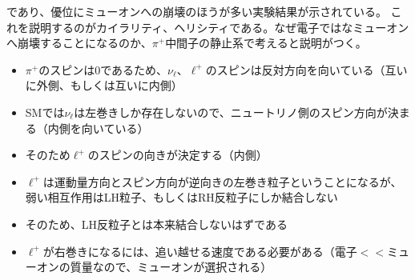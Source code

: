 であり、優位にミューオンへの崩壊のほうが多い実験結果が示されている。
これを説明するのがカイラリティ、ヘリシティである。なぜ電子ではなミューオンへ崩壊することになるのか、$\pi^+$中間子の静止系で考えると説明がつく。
\begin{itemize}
  \item $\pi^+$のスピンは0であるため、$\nu_\ell$、$\ell^+$のスピンは反対方向を向いている（互いに外側、もしくは互いに内側）
  \item SMでは$\nu_\ell$は左巻きしか存在しないので、ニュートリノ側のスピン方向が決まる（内側を向いている）
  \item そのため$\ell^+$のスピンの向きが決定する（内側）
  \item $\ell^+$は運動量方向とスピン方向が逆向きの左巻き粒子ということになるが、弱い相互作用はLH粒子、もしくはRH反粒子にしか結合しない
  \item そのため、LH反粒子とは本来結合しないはずである
  \item $\ell^+$が右巻きになるには、追い越せる速度である必要がある（電子$<<$ミューオンの質量なので、ミューオンが選択される）
\end{itemize}
